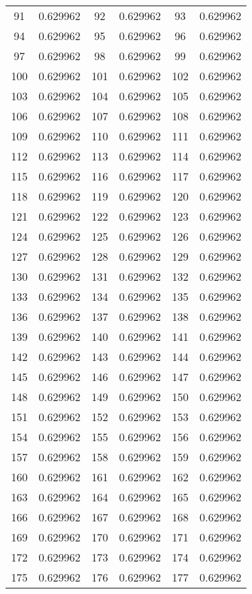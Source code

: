 \documentclass[12pt]{article}
\begin{document}
\begin{longtable}{@{}cc|cc|cc@{}}
91 & 0.629962 & 92 & 0.629962 & 93 & 0.629962 \\
94 & 0.629962 & 95 & 0.629962 & 96 & 0.629962 \\
97 & 0.629962 & 98 & 0.629962 & 99 & 0.629962 \\
100 & 0.629962 & 101 & 0.629962 & 102 & 0.629962 \\
103 & 0.629962 & 104 & 0.629962 & 105 & 0.629962 \\
106 & 0.629962 & 107 & 0.629962 & 108 & 0.629962 \\
109 & 0.629962 & 110 & 0.629962 & 111 & 0.629962 \\
112 & 0.629962 & 113 & 0.629962 & 114 & 0.629962 \\
115 & 0.629962 & 116 & 0.629962 & 117 & 0.629962 \\
118 & 0.629962 & 119 & 0.629962 & 120 & 0.629962 \\
121 & 0.629962 & 122 & 0.629962 & 123 & 0.629962 \\
124 & 0.629962 & 125 & 0.629962 & 126 & 0.629962 \\
127 & 0.629962 & 128 & 0.629962 & 129 & 0.629962 \\
130 & 0.629962 & 131 & 0.629962 & 132 & 0.629962 \\
133 & 0.629962 & 134 & 0.629962 & 135 & 0.629962 \\
136 & 0.629962 & 137 & 0.629962 & 138 & 0.629962 \\
139 & 0.629962 & 140 & 0.629962 & 141 & 0.629962 \\
142 & 0.629962 & 143 & 0.629962 & 144 & 0.629962 \\
145 & 0.629962 & 146 & 0.629962 & 147 & 0.629962 \\
148 & 0.629962 & 149 & 0.629962 & 150 & 0.629962 \\
151 & 0.629962 & 152 & 0.629962 & 153 & 0.629962 \\
154 & 0.629962 & 155 & 0.629962 & 156 & 0.629962 \\
157 & 0.629962 & 158 & 0.629962 & 159 & 0.629962 \\
160 & 0.629962 & 161 & 0.629962 & 162 & 0.629962 \\
163 & 0.629962 & 164 & 0.629962 & 165 & 0.629962 \\
166 & 0.629962 & 167 & 0.629962 & 168 & 0.629962 \\
169 & 0.629962 & 170 & 0.629962 & 171 & 0.629962 \\
172 & 0.629962 & 173 & 0.629962 & 174 & 0.629962 \\
175 & 0.629962 & 176 & 0.629962 & 177 & 0.629962 \\

\end{longtable}
\end{document}
